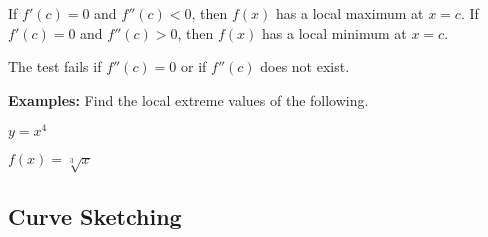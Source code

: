 \documentclass[addpoints, 12pt]{exam}
\begin{document}
\newpage


\begin{tcolorbox}[title= THE SECOND DERIVATIVE TEST,black,sharp corners,colback=white,colbacktitle=white,coltitle=black,boxrule=1pt]

    \begin{questions}
        \question If $f'(c)=0$ and $f''(c)<0$, then $f(x)$ has a local maximum at $x=c$.
        \question If $f'(c)=0$ and $f''(c)>0$, then $f(x)$ has a local minimum at $x=c$.
    \end{questions}
    
    The test fails if $f''(c)=0$ or if $f''(c)$ does not exist.
    
\end{tcolorbox}

\textbf{Examples:} Find the local extreme values of the following.
\begin{questions}
    \begin{minipage}{.45\linewidth}
        \question $y=x^4$
    \end{minipage}
    \hfill
    \begin{minipage}{.45\linewidth}
        \question $f(x)=\sqrt[3]{x}$
    \end{minipage}

\end{questions}

\subsection*{Curve Sketching}
\end{document}
